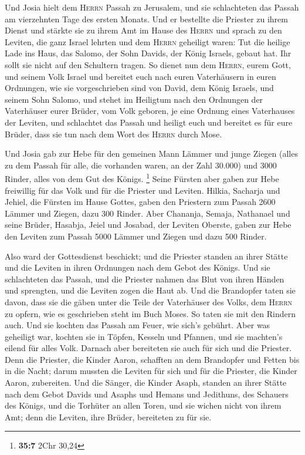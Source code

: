  Und Josia hielt dem \textsc{Herrn} Passah zu Jerusalem,
und sie schlachteten das Passah am vierzehnten Tage des ersten Monats.
 Und er bestellte die Priester zu ihrem Dienst und stärkte
sie zu ihrem Amt im Hause des \textsc{Herrn}  und sprach
zu den Leviten, die ganz Israel lehrten und dem \textsc{Herrn} geheiligt
waren: Tut die heilige Lade ins Haus, das Salomo, der Sohn Davids, der
König Israels, gebaut hat. Ihr sollt sie nicht auf den Schultern tragen.
So dienet nun dem \textsc{Herrn}, eurem Gott, und seinem Volk Israel
 und bereitet euch nach euren Vaterhäusern in euren
Ordnungen, wie sie vorgeschrieben sind von David, dem König Israels, und
seinem Sohn Salomo,  und stehet im Heiligtum nach den
Ordnungen der Vaterhäuser eurer Brüder, vom Volk geboren, je eine
Ordnung eines Vaterhauses der Leviten,  und schlachtet das
Passah und heiligt euch und bereitet es für eure Brüder, dass sie tun
nach dem Wort des \textsc{Herrn} durch Mose.

 Und Josia gab zur Hebe für den gemeinen Mann Lämmer und
junge Ziegen (alles zu dem Passah für alle, die vorhanden waren, an der
Zahl 30.000) und 3000 Rinder, alles von dem Gut des Königs. \footnote{\textbf{35:7}
  2Chr 30,24}  Seine Fürsten aber gaben zur Hebe
freiwillig für das Volk und für die Priester und Leviten. Hilkia,
Sacharja und Jehiel, die Fürsten im Hause Gottes, gaben den Priestern
zum Passah 2600 Lämmer und Ziegen, dazu 300 Rinder.  Aber
Chananja, Semaja, Nathanael und seine Brüder, Hasabja, Jeiel und
Josabad, der Leviten Oberste, gaben zur Hebe den Leviten zum Passah 5000
Lämmer und Ziegen und dazu 500 Rinder.

 Also ward der Gottesdienst beschickt; und die Priester
standen an ihrer Stätte und die Leviten in ihren Ordnungen nach dem
Gebot des Königs.  Und sie schlachteten das Passah, und
die Priester nahmen das Blut von ihren Händen und sprengten, und die
Leviten zogen die Haut ab.  Und die Brandopfer taten sie
davon, dass sie die gäben unter die Teile der Vaterhäuser des Volks, dem
\textsc{Herrn} zu opfern, wie es geschrieben steht im Buch Moses. So
taten sie mit den Rindern auch.  Und sie kochten das
Passah am Feuer, wie sich's gebührt. Aber was geheiligt war, kochten sie
in Töpfen, Kesseln und Pfannen, und sie machten's eilend für alles Volk.
 Darnach aber bereiteten sie auch für sich und die
Priester. Denn die Priester, die Kinder Aaron, schafften an dem
Brandopfer und Fetten bis in die Nacht; darum mussten die Leviten für
sich und für die Priester, die Kinder Aaron, zubereiten. 
Und die Sänger, die Kinder Asaph, standen an ihrer Stätte nach dem Gebot
Davids und Asaphs und Hemans und Jedithuns, des Schauers des Königs, und
die Torhüter an allen Toren, und sie wichen nicht von ihrem Amt; denn
die Leviten, ihre Brüder, bereiteten zu für sie.

